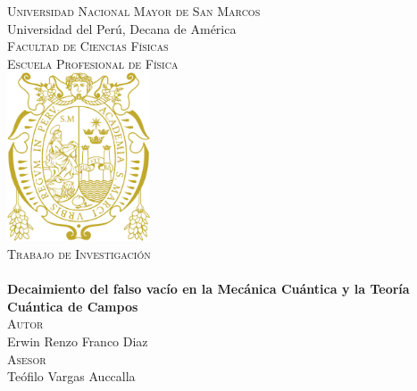 \documentclass[12pt, a4paper, oneside]{book}
\begin{document}
	
\frontmatter
	
\begin{titlepage}
\begin{center}

\thispagestyle{empty}

\textsc{\LARGE{Universidad Nacional Mayor de San Marcos}} \\
\large{Universidad del Perú, Decana de América} \\ [0.5cm] 
\textsc{\LARGE Facultad de Ciencias Físicas} \\  
\textsc{\Large Escuela Profesional de Física} \\ [1cm]

\includegraphics*[height = 5cm]{unmsm_logo.png} \\ [1cm]

\textsc{\LARGE Trabajo de Investigación} \\ [0.25cm]
\large {} \\ [0.5cm]

\LARGE{\bfseries{Decaimiento del falso vacío en la Mecánica Cuántica y la Teoría Cuántica de Campos}} \\ [0.5cm] 

\textsc{\LARGE Autor} \\ [0.25cm] 
\large{Erwin Renzo Franco Diaz} \\ [0.5cm]

\textsc{\LARGE Asesor} \\ [0.25cm] 
\large{Teófilo Vargas Auccalla} \\ 

\vfill

\large {} \\ [0.25cm]
\large {}

\end{center}
\end{titlepage}

\end{document}
